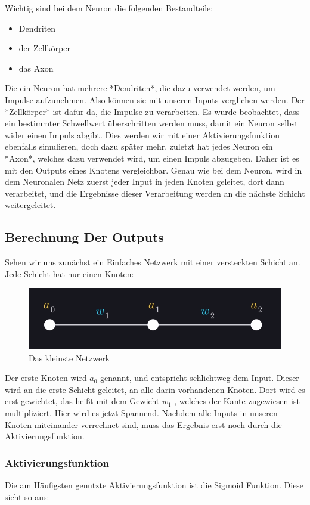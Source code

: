 \documentclass[12pt]{article}
\begin{document}
Wichtig sind bei dem Neuron die folgenden Bestandteile:
\begin{itemize}
  \item Dendriten
  \item der Zellkörper
  \item das Axon
\end{itemize}
  Die ein Neuron hat mehrere *Dendriten*, die dazu verwendet werden, um Impulse aufzunehmen. Also können sie mit unseren Inputs verglichen werden. Der *Zellkörper* ist dafür da, die Impulse zu verarbeiten. Es wurde beobachtet, dass ein bestimmter Schwellwert überschritten werden muss, damit ein Neuron selbst wider einen Impuls abgibt. Dies werden wir mit einer Aktivierungsfunktion ebenfalls simulieren, doch dazu später mehr. zuletzt hat jedes Neuron ein *Axon*, welches dazu verwendet wird, um einen Impuls abzugeben. Daher ist es mit den Outputs eines Knotens vergleichbar.
  Genau wie bei dem Neuron, wird in dem Neuronalen Netz zuerst jeder Input in jeden Knoten geleitet, dort dann verarbeitet, und die Ergebnisse dieser Verarbeitung werden an die nächste Schicht weitergeleitet.\subsection{Berechnung Der Outputs}Sehen wir uns zunächst ein Einfaches Netzwerk mit einer versteckten Schicht an. Jede Schicht hat nur einen Knoten:
\begin{figure}[H]
\centering
\includegraphics[scale=0.5]{./Images/Pasted image 20230912184748.png}
\caption{Das kleinste Netzwerk}
\label{Was kommt hier rein?}\end{figure}Der erste Knoten wird $a_0$ genannt, und entspricht schlichtweg dem Input. Dieser wird an die erste Schicht geleitet, an alle darin vorhandenen Knoten. Dort wird es erst gewichtet, das heißt mit dem Gewicht $w_1$ , welches der Kante zugewiesen ist multipliziert. Hier wird es jetzt Spannend. Nachdem alle Inputs in unseren Knoten miteinander verrechnet sind, muss das Ergebnis erst noch durch die Aktivierungsfunktion.\subsubsection{Aktivierungsfunktion}Die am Häufigsten genutzte Aktivierungsfunktion ist die Sigmoid Funktion. Diese sieht so aus:
\end{document}
